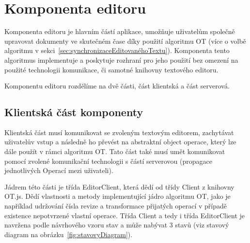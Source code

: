 
\section{Komponenta editoru}\label{sec:komponentaEditoru}

Komponenta editoru je hlavním částí aplikace, umožňuje uživatelům společně upravovat dokumenty ve skutečném čase díky použití algoritmu \gls{OT} (více o volbě algoritmu v sekci~\ref{sec:synchronizaceEditovanéhoTextu}).
Komponenta tento algoritmus implementuje a poskytuje rozhraní pro jeho použití bez omezení na použité technologii komunikace, či samotné knihovny textového editoru.

Komponentu editoru rozdělíme na dvě části, část klientská a část serverová.

\subsection{Klientská část komponenty}\label{subsec:klientskáČást}

Klientská část musí komunikovat se zvoleným textovým editorem, zachytávat uživatelův vstup a následně ho převést na abstraktní object operace, který lze dále použít v rámci algoritmu \gls{OT}.
Tato část také musí umět komunikovat pomocí zvolené komunikační technologii s částí serverovou (propagace jednotlivých Operací mezi uživateli).

Jádrem této části je třída EditorClient, která dědí od třídy Client z knihovny OT.js.
Dědí vlastnosti a metody implementující jádro algoritmu \gls{OT}, jako je například udržování čísla revize a transformace přijatých operací v případě existence nepotvrzené vlastní operace.
Třída Client a tedy i třída EditorClient je navržena podle návrhového vzoru stav a může nabývat 3 stavů (viz stavový diagram na obrázku~\ref{fig:stavovyDiagram}).

